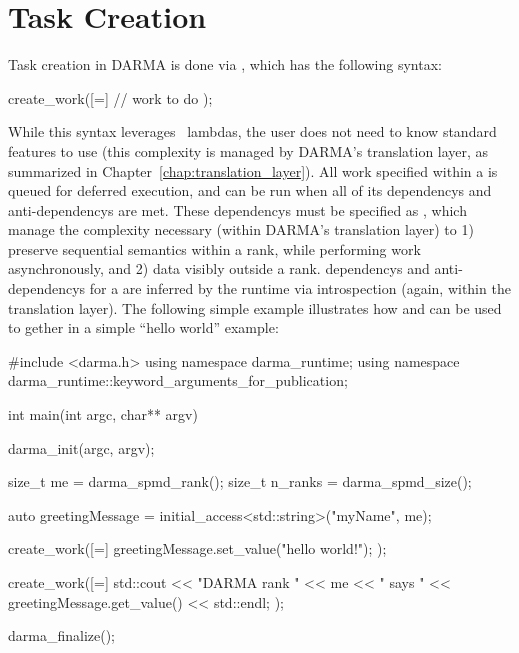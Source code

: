 \section{Task Creation}
\label{sec:deferred}
Task creation in DARMA is done via , which has the
following syntax:
\begin{CppCode}
  create_work([=]
  {
    // work to do
  });
\end{CppCode}

While this syntax leverages \CC\ lambdas, the user does not need to know 
standard features to use  (this
complexity is managed by DARMA's translation layer, as summarized in
Chapter~\ref{chap:translation_layer}).  All work specified within a
 is queued for deferred execution, and can be run when
all of its \glspl{dependency} and \glspl{anti-dependency} are met.  
These \glspl{dependency} must be specified as , 
which manage the complexity necessary (within DARMA's \gls{translation layer}) to 1) preserve \gls{sequential
semantics} within a \gls{rank}, while performing work asynchronously, and 2) 
 data visibly outside a \gls{rank}.
\Glspl{dependency} and \glspl{anti-dependency} for a 
 are inferred by the runtime via
\gls{introspection} (again, within the \gls{translation layer}). 
The following simple example illustrates how  and
 can be used to gether in a simple ``hello world''
example:


\begin{CppCode}
#include <darma.h>
using namespace darma_runtime;
using namespace darma_runtime::keyword_arguments_for_publication;

int main(int argc, char** argv) {

  darma_init(argc, argv);

  size_t me = darma_spmd_rank();
  size_t n_ranks = darma_spmd_size();

  auto greetingMessage = initial_access<std::string>("myName", me);

  create_work([=]
  {
    greetingMessage.set_value("hello world!");
  });

  create_work([=]
  {
    std::cout << "DARMA rank " << me << " says " 
              << greetingMessage.get_value() << std::endl;
  });

  darma_finalize();

}
\end{CppCode}

